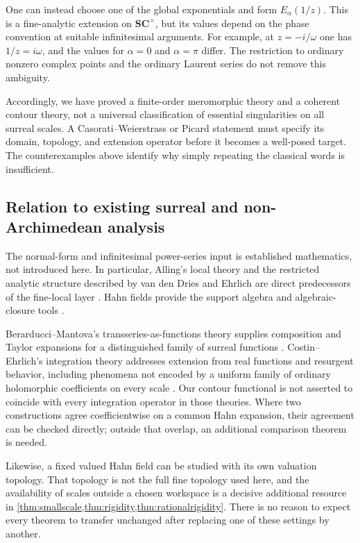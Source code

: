 \documentclass[11pt,letterpaper]{article}
\theoremstyle{definition}
\theoremstyle{remark}
\newcommand{\SC}{\mathbf{SC}}
\numberwithin{equation}{section}
\begin{document}
One can instead choose one of the global exponentials and form $E_\alpha(1/z)$. This is a fine-analytic extension on $\SC^\times$, but its values depend on the phase convention at suitable infinitesimal arguments. For example, at $z=-i/\omega$ one has $1/z=i\omega$, and the values for $\alpha=0$ and $\alpha=\pi$ differ. The restriction to ordinary nonzero complex points and the ordinary Laurent series do not remove this ambiguity.

Accordingly, we have proved a finite-order meromorphic theory and a coherent contour theory, not a universal classification of essential singularities on all surreal scales. A Casorati--Weierstrass or Picard statement must specify its domain, topology, and extension operator before it becomes a well-posed target. The counterexamples above identify why simply repeating the classical words is insufficient.

\subsection{Relation to existing surreal and non-Archimedean analysis}
The normal-form and infinitesimal power-series input is established mathematics, not introduced here. In particular, Alling's local theory and the restricted analytic structure described by van den Dries and Ehrlich are direct predecessors of the fine-local layer \cite{Alling,vdDE}. Hahn fields provide the support algebra and algebraic-closure tools \cite{Neumann,Poonen}.

Berarducci--Mantova's transseries-as-functions theory supplies composition and Taylor expansions for a distinguished family of surreal functions \cite{BMfunctions}. Costin--Ehrlich's integration theory addresses extension from real functions and resurgent behavior, including phenomena not encoded by a uniform family of ordinary holomorphic coefficients on every scale \cite{CE}. Our contour functional is not asserted to coincide with every integration operator in those theories. Where two constructions agree coefficientwise on a common Hahn expansion, their agreement can be checked directly; outside that overlap, an additional comparison theorem is needed.

Likewise, a fixed valued Hahn field can be studied with its own valuation topology. That topology is not the full fine topology used here, and the availability of scales outside a chosen workspace is a decisive additional resource in \cref{thm:smallscale,thm:rigidity,thm:rationalrigidity}. There is no reason to expect every theorem to transfer unchanged after replacing one of these settings by another.
\end{document}
